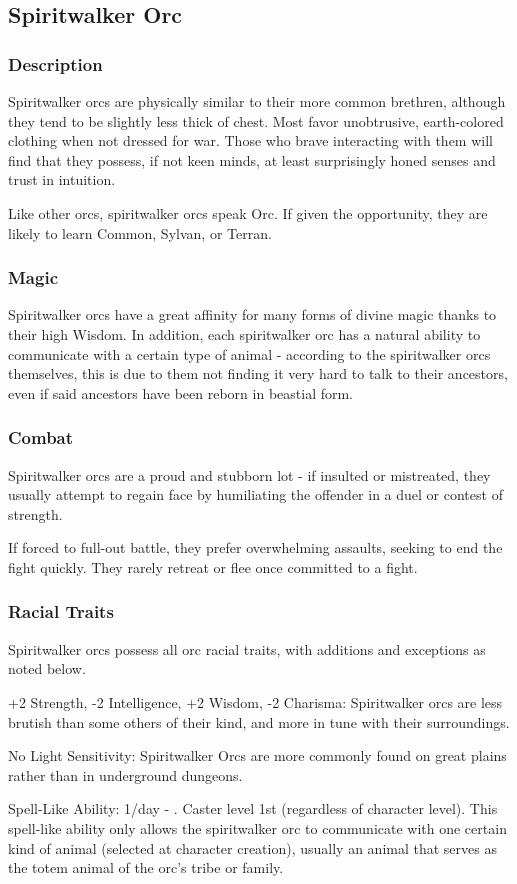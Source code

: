 \subsection{Spiritwalker Orc}
\subsubsection{Description}
Spiritwalker orcs are physically similar to their more common brethren, although they tend to be slightly less thick of chest. Most favor unobtrusive, earth-colored clothing when not dressed for war. Those who brave interacting with them will find that they possess, if not keen minds, at least surprisingly honed senses and trust in intuition.

Like other orcs, spiritwalker orcs speak Orc. If given the opportunity, they are likely to learn Common, Sylvan, or Terran.
\subsubsection{Magic}
Spiritwalker orcs have a great affinity for many forms of divine magic thanks to their high Wisdom. In addition, each spiritwalker orc has a natural ability to communicate with a certain type of animal - according to the spiritwalker orcs themselves, this is due to them not finding it very hard to talk to their ancestors, even if said ancestors have been reborn in beastial form.
\subsubsection{Combat}
Spiritwalker orcs are a proud and stubborn lot - if insulted or mistreated, they usually attempt to regain face by humiliating the offender in a duel or contest of strength. 

If forced to full-out battle, they prefer overwhelming assaults, seeking to end the fight quickly. They rarely retreat or flee once committed to a fight.
\subsubsection{Racial Traits}
Spiritwalker orcs possess all orc racial traits, with additions and exceptions as noted below.
\begin{list}{}{\leftmargin=1em}
 \item +2 Strength, -2 Intelligence, +2 Wisdom, -2 Charisma: Spiritwalker orcs are less brutish than some others of their kind, and more in tune with their surroundings.
 \item No Light Sensitivity: Spiritwalker Orcs are more commonly found on great plains rather than in underground dungeons.
 \item Spell-Like Ability: 1/day - . Caster level 1st (regardless of character level). This spell-like ability only allows the spiritwalker orc to communicate with one certain kind of animal (selected at character creation), usually an animal that serves as the totem animal of the orc's tribe or family.
\end{list}
